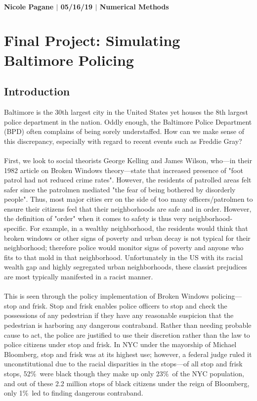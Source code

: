 \documentclass[10pt]{article}
\begin{document}
\paragraph{Nicole Pagane $|$ 05/16/19 $|$ Numerical Methods}

\section*{Final Project: Simulating Baltimore Policing}

\subsection*{Introduction}
Baltimore is the 30th largest city in the United States yet houses the 8th largest police department in the nation. Oddly enough, the Baltimore Police Department (BPD) often complains of being sorely understaffed. How can we make sense of this discrepancy, especially with regard to recent events such as Freddie Gray?\\
\\
First, we look to social theorists George Kelling and James Wilson, who---in their 1982 article on Broken Windows theory---state that increased presence of "foot patrol had not reduced crime rates". However, the residents of patrolled areas felt safer since the patrolmen mediated "the fear of being bothered by disorderly people". Thus, most major cities err on the side of too many officers/patrolmen to ensure their citizens feel that their neighborhoods are safe and in order. However, the definition of "order" when it comes to safety is thus very neighborhood-specific. For example, in a wealthy neighborhood, the  residents would think that broken windows or other signs of poverty and urban decay is not typical for their neighborhood; therefore police would monitor signs of poverty and anyone who fits to that mold in that neighborhood. Unfortunately in the US with its racial wealth gap and highly segregated urban neighborhoods, these classist prejudices are most typically manifested in a racist manner.\\
\\
This is seen through the policy implementation of Broken Windows policing---stop and frisk. Stop and frisk enables police officers to stop and check the possessions of any pedestrian if they have any reasonable suspicion that the pedestrian is harboring any dangerous contraband. Rather than needing  probable cause to act, the police are justified to use their discretion rather than the law to police citizens under stop and frisk. In NYC under the mayorship of Michael Bloomberg, stop and frisk was at its highest use; however, a federal judge ruled it unconstitutional due to the racial disparities in the stops---of all stop and frisk stops, 52\%\ were black though they make up only 23\%\ of the NYC population, and out of these 2.2 million stops of black citizens under the reign of Bloomberg, only 1\%\ led to finding dangerous contraband.\\
\end{document}
